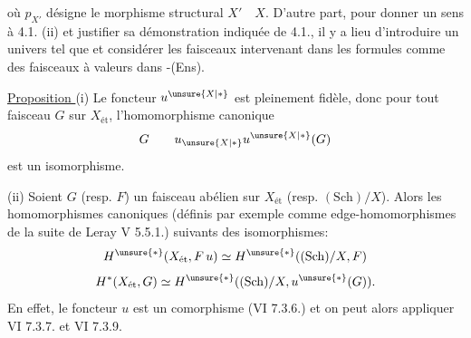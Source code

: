 
où $p_{X'}$ désigne le morphisme structural $X'\quad X$.
D'autre part, pour donner un sens à 4.1. (ii) et justifier sa démonstration
indiquée de 4.1., il y a lieu d'introduire un univers \quad tel que \quad
\unsure{,}
et considérer les faisceaux intervenant dans les formules 
comme des faisceaux à valeurs dans \quad -(Ens).

\uline{Proposition } (i) Le foncteur
$u^{\unsure{X|*}}$ est pleinement fidèle, donc pour tout faisceau $G$
sur $X_{\text{ét}}$, l'homomorphisme canonique
\[
G\qquad u_{\unsure{X|*}}u^{\unsure{X|*}}(G)
\]
est un isomorphisme.

(ii) Soient $G$ (resp. $F$) un faisceau abélien sur $X_{\text{ét}}$
(resp. $(\mathrm{Sch})/X$).
Alors les homomorphismes canoniques (définis par exemple comme
edge-homomorphismes de la suite  de Leray V 5.5.1.)
suivants  des isomorphismes:
\[
H^{\unsure{*}}(X_{\text{ét}},F\,u)\simeq
H^{\unsure{*}}((\mathrm{Sch})/X,F)
\]
\[
H^*(X_{\text{ét}},G)\simeq
H^{\unsure{*}}((\mathrm{Sch})/X,u^{\unsure{*}}(G)).
\]
En effet, le foncteur $u$ est un comorphisme (VI 7.3.6.) et on peut alors
appliquer VI 7.3.7. et VI 7.3.9.
